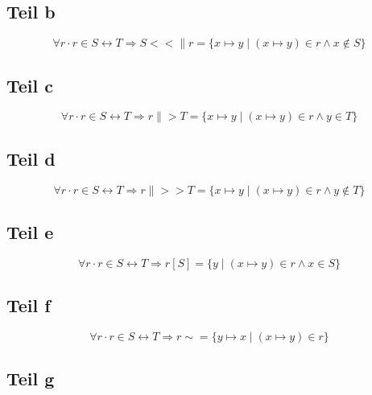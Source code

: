 \documentclass[10pt,a4paper]{article}
\begin{document}
\subsection{Teil b}

\begin{equation}
  \forall r \cdot r \in S \leftrightarrow T \Rightarrow S <<\| r = \{ x \mapsto y \mid (x \mapsto y) \in r \land x \not\in S \}
\end{equation}

\subsection{Teil c}

\begin{equation}
  \forall r \cdot r \in S \leftrightarrow T \Rightarrow r \|> T = \{ x \mapsto y \mid (x \mapsto y) \in r \land y \in T \}
\end{equation}

\subsection{Teil d}

\begin{equation}
  \forall r \cdot r \in S \leftrightarrow T \Rightarrow r \|>> T = \{ x \mapsto y \mid (x \mapsto y) \in r \land y \not\in T \}
\end{equation}

\subsection{Teil e}

\begin{equation}
  \forall r \cdot r \in S \leftrightarrow T \Rightarrow r[S] = \{ y \mid (x \mapsto y) \in r \land x \in S \}
\end{equation}

\subsection{Teil f}

\begin{equation}
  \forall r \cdot r \in S \leftrightarrow T \Rightarrow r\sim = \{ y \mapsto x \mid (x \mapsto y) \in r \}
\end{equation}

\subsection{Teil g}
\end{document}
